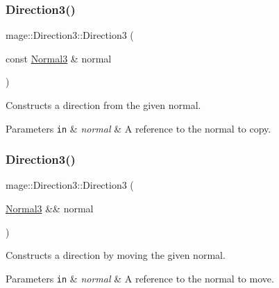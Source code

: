 \subsubsection{\texorpdfstring{Direction3()}{Direction3()}\hspace{0.1cm}{\footnotesize\ttfamily [5/8]}}
{\footnotesize\ttfamily mage\+::\+Direction3\+::\+Direction3 (\begin{DoxyParamCaption}\item[{const \hyperlink{structmage_1_1_normal3}{Normal3} \&}]{normal }\end{DoxyParamCaption})\hspace{0.3cm}{\ttfamily [noexcept]}}

Constructs a direction from the given normal.


\begin{DoxyParams}[1]{Parameters}
\mbox{\tt in}  & {\em normal} & A reference to the normal to copy. \\
\hline
\end{DoxyParams}
\hypertarget{structmage_1_1_direction3_ae9b26ed667537e7751b495058bb71de0}{}\label{structmage_1_1_direction3_ae9b26ed667537e7751b495058bb71de0} 
\subsubsection{\texorpdfstring{Direction3()}{Direction3()}\hspace{0.1cm}{\footnotesize\ttfamily [6/8]}}
{\footnotesize\ttfamily mage\+::\+Direction3\+::\+Direction3 (\begin{DoxyParamCaption}\item[{\hyperlink{structmage_1_1_normal3}{Normal3} \&\&}]{normal }\end{DoxyParamCaption})\hspace{0.3cm}{\ttfamily [noexcept]}}

Constructs a direction by moving the given normal.


\begin{DoxyParams}[1]{Parameters}
\mbox{\tt in}  & {\em normal} & A reference to the normal to move. \\
\hline
\end{DoxyParams}
\hypertarget{structmage_1_1_direction3_a1230915b5196dfb1f453a612837f2cce}{}\label{structmage_1_1_direction3_a1230915b5196dfb1f453a612837f2cce} 

